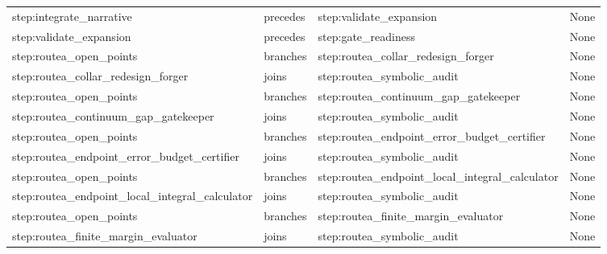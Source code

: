 \documentclass[10pt,a4paper]{article}
\begin{document}
\begin{longtable}{@{}>{\raggedright\arraybackslash}p{.24\linewidth}>{\raggedright\arraybackslash}p{.12\linewidth}>{\raggedright\arraybackslash}p{.24\linewidth}>{\raggedright\arraybackslash}p{.20\linewidth}@{}}
step:\allowbreak{}integrate\_\allowbreak{}narrative & precedes & step:\allowbreak{}validate\_\allowbreak{}expansion & None\\
step:\allowbreak{}validate\_\allowbreak{}expansion & precedes & step:\allowbreak{}gate\_\allowbreak{}readiness & None\\
step:\allowbreak{}routea\_\allowbreak{}open\_\allowbreak{}points & branches & step:\allowbreak{}routea\_\allowbreak{}collar\_\allowbreak{}redesign\_\allowbreak{}forger & None\\
step:\allowbreak{}routea\_\allowbreak{}collar\_\allowbreak{}redesign\_\allowbreak{}forger & joins & step:\allowbreak{}routea\_\allowbreak{}symbolic\_\allowbreak{}audit & None\\
step:\allowbreak{}routea\_\allowbreak{}open\_\allowbreak{}points & branches & step:\allowbreak{}routea\_\allowbreak{}continuum\_\allowbreak{}gap\_\allowbreak{}gatekeeper\allowbreak{} & None\\
step:\allowbreak{}routea\_\allowbreak{}continuum\_\allowbreak{}gap\_\allowbreak{}gatekeeper\allowbreak{} & joins & step:\allowbreak{}routea\_\allowbreak{}symbolic\_\allowbreak{}audit & None\\
step:\allowbreak{}routea\_\allowbreak{}open\_\allowbreak{}points & branches & step:\allowbreak{}routea\_\allowbreak{}endpoint\_\allowbreak{}error\_\allowbreak{}budget\_\allowbreak{}certifier & None\\
step:\allowbreak{}routea\_\allowbreak{}endpoint\_\allowbreak{}error\_\allowbreak{}budget\_\allowbreak{}certifier & joins & step:\allowbreak{}routea\_\allowbreak{}symbolic\_\allowbreak{}audit & None\\
step:\allowbreak{}routea\_\allowbreak{}open\_\allowbreak{}points & branches & step:\allowbreak{}routea\_\allowbreak{}endpoint\_\allowbreak{}local\_\allowbreak{}integral\_\allowbreak{}calculator\allowbreak{} & None\\
step:\allowbreak{}routea\_\allowbreak{}endpoint\_\allowbreak{}local\_\allowbreak{}integral\_\allowbreak{}calculator\allowbreak{} & joins & step:\allowbreak{}routea\_\allowbreak{}symbolic\_\allowbreak{}audit & None\\
step:\allowbreak{}routea\_\allowbreak{}open\_\allowbreak{}points & branches & step:\allowbreak{}routea\_\allowbreak{}finite\_\allowbreak{}margin\_\allowbreak{}evaluator & None\\
step:\allowbreak{}routea\_\allowbreak{}finite\_\allowbreak{}margin\_\allowbreak{}evaluator & joins & step:\allowbreak{}routea\_\allowbreak{}symbolic\_\allowbreak{}audit & None\\

\end{longtable}
\end{document}
